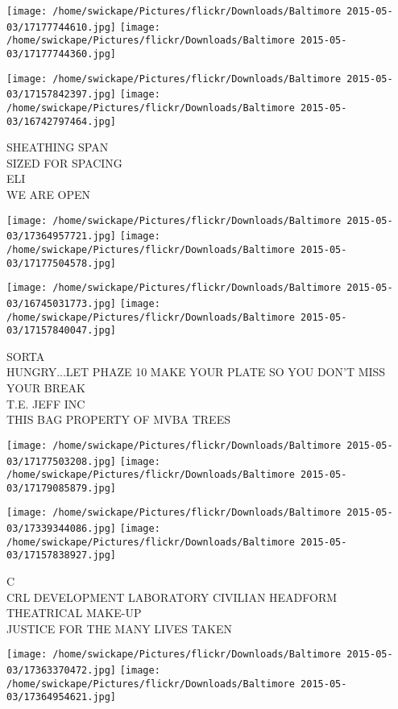 \documentclass[10pt,letterpaper]{article}
\begin{document}
\texttt{[image: /home/swickape/Pictures/flickr/Downloads/Baltimore 2015-05-03/17177744610.jpg]}
\texttt{[image: /home/swickape/Pictures/flickr/Downloads/Baltimore 2015-05-03/17177744360.jpg]}

\texttt{[image: /home/swickape/Pictures/flickr/Downloads/Baltimore 2015-05-03/17157842397.jpg]}
\texttt{[image: /home/swickape/Pictures/flickr/Downloads/Baltimore 2015-05-03/16742797464.jpg]}

SHEATHING SPAN\\
SIZED FOR SPACING\\
ELI\\
WE ARE OPEN
\pagebreak

\texttt{[image: /home/swickape/Pictures/flickr/Downloads/Baltimore 2015-05-03/17364957721.jpg]}
\texttt{[image: /home/swickape/Pictures/flickr/Downloads/Baltimore 2015-05-03/17177504578.jpg]}

\texttt{[image: /home/swickape/Pictures/flickr/Downloads/Baltimore 2015-05-03/16745031773.jpg]}
\texttt{[image: /home/swickape/Pictures/flickr/Downloads/Baltimore 2015-05-03/17157840047.jpg]}

SORTA\\
HUNGRY...LET PHAZE 10 MAKE YOUR PLATE SO YOU DON'T MISS YOUR BREAK\\
T.E. JEFF INC\\
THIS BAG PROPERTY OF MVBA TREES
\pagebreak

\texttt{[image: /home/swickape/Pictures/flickr/Downloads/Baltimore 2015-05-03/17177503208.jpg]}
\texttt{[image: /home/swickape/Pictures/flickr/Downloads/Baltimore 2015-05-03/17179085879.jpg]}

\texttt{[image: /home/swickape/Pictures/flickr/Downloads/Baltimore 2015-05-03/17339344086.jpg]}
\texttt{[image: /home/swickape/Pictures/flickr/Downloads/Baltimore 2015-05-03/17157838927.jpg]}

C\\
CRL DEVELOPMENT LABORATORY CIVILIAN HEADFORM\\
THEATRICAL MAKE{-}UP\\
JUSTICE FOR THE MANY LIVES TAKEN
\pagebreak

\texttt{[image: /home/swickape/Pictures/flickr/Downloads/Baltimore 2015-05-03/17363370472.jpg]}
\texttt{[image: /home/swickape/Pictures/flickr/Downloads/Baltimore 2015-05-03/17364954621.jpg]}
\end{document}
